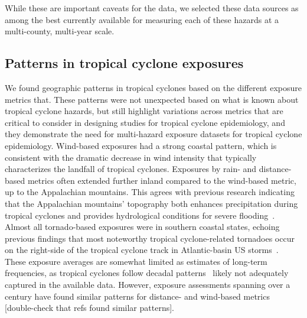 \begin{comment}
[For discussion?] Based on these results, the two data sources were generally
in agreement, but the analysis highlights the difficulty of assessing
storm-related flooding at a multi-county, multi-year scale, as flooding can be
very localized within a county or can \ldots .   
\end{comment}

While these are important caveats for the data, we selected these data sources
as among the best currently available for measuring each of these hazards at a
multi-county, multi-year scale.

\subsection*{Patterns in tropical cyclone exposures}

We found geographic patterns in tropical cyclones based on the different
exposure metrics that. These patterns were not unexpected based on what is
known about tropical cyclone hazards, but still highlight variations across
metrics that are critical to consider in designing studies for tropical cyclone
epidemiology, and they demonstrate the need for multi-hazard exposure datasets
for tropical cyclone epidemiology. Wind-based exposures had a strong coastal
pattern, which is consistent with the dramatic decrease in wind intensity that
typically characterizes the landfall of tropical cyclones. Exposures by rain-
and distance-based metrics often extended further inland compared to the
wind-based metric, up to the Appalachian mountains. This agrees with previous
research indicating that the Appalachian mountains' topography both enhances
precipitation during tropical cyclones and provides hydrological conditions for
severe flooding~\parencite{rees2001}.  Almost all tornado-based exposures were
in southern coastal states, echoing previous findings that most noteworthy
tropical cyclone-related tornadoes occur on the right-side of the tropical
cyclone track in Atlantic-basin \ac{US} storms~\parencite{moore2012}.  These
exposure averages are somewhat limited as estimates of long-term frequencies,
as tropical cyclones follow decadal patterns~\parencite{kossin2007more} likely
not adequately captured in the available data. However, exposure assessments
spanning over a century have found similar patterns for distance- and
wind-based metrics~\textcite{zandbergen2009, kruk2010} [double-check that refs
found similar patterns].

